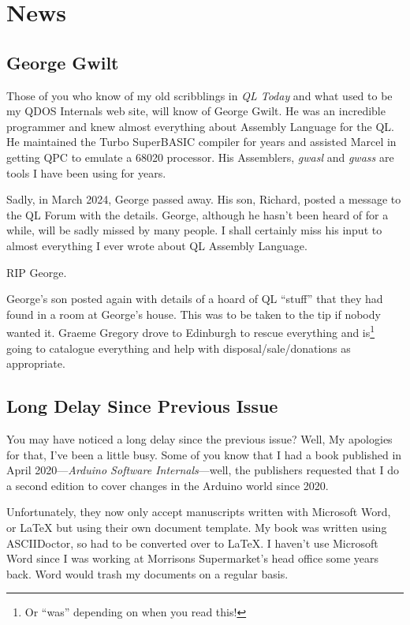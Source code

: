 
\chapter{News}



\section{George Gwilt}

Those of you who know of my old scribblings in \emph{QL Today} and what used to be my QDOS Internals web site, will know of George Gwilt. He was an incredible programmer and knew almost everything about Assembly Language for the QL. He maintained the Turbo SuperBASIC compiler for years and assisted Marcel in getting QPC to emulate a 68020 processor. His Assemblers, \emph{gwasl} and \emph{gwass} are tools I have been using for years.

Sadly, in March 2024, George passed away. His son, Richard, posted a message to the QL Forum with the details. George, although he hasn't been heard of for a while, will be sadly missed by many people. I shall certainly miss his input to almost everything I ever wrote about QL Assembly Language.

RIP George.

George's son posted again with details of a hoard of QL ``stuff'' that they had found in a room at George's house. This was to be taken to the tip if nobody wanted it. Graeme Gregory drove to Edinburgh to rescue everything and is\footnote{Or ``was'' depending on when you read this!} going to catalogue everything and help with disposal/sale/donations as appropriate.

\section{Long Delay Since Previous Issue}

You may have noticed a long delay since the previous issue? Well, My apologies for that, I've been a little busy. Some of you know that I had a book published in April 2020---\emph{Arduino Software Internals}---well, the publishers requested that I do a second edition to cover changes in the Arduino world since 2020.

Unfortunately, they now only accept manuscripts written with Microsoft Word, or \LaTeX{} but using their own document template. My book was written using ASCIIDoctor, so had to be converted over to \LaTeX{}. I haven't use Microsoft Word since I was working at Morrisons Supermarket's head office some years back. Word would trash my documents on a regular basis.

